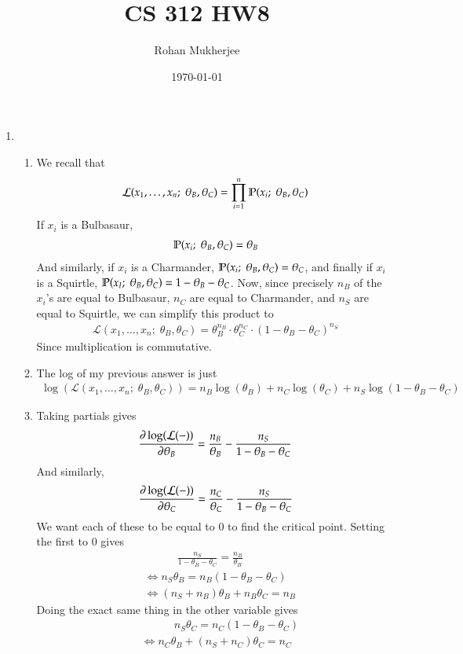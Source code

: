 \documentclass[12pt]{article}
\title{CS 312 HW8}
\date{\today}
\author{Rohan Mukherjee}
\theoremstyle{definitionstyle}
\renewcommand{\P}{\mathbb{P}\qty}
\renewcommand{\L}{\mathcal{L}}
\newcommand{\semi}{; \;}
\begin{document}
	\maketitle
	\begin{enumerate}[leftmargin=\labelsep]
		\item \begin{enumerate}
			\item We recall that 
			\begin{align*}
				\mathcal{L}(x_1, \ldots, x_n \semi \theta_B, \theta_C) = \prod_{i=1}^n \P(x_i \semi \theta_B, \theta_C)
			\end{align*}
			If $x_i$ is a Bulbasaur, 
			\begin{align*}
				\P(x_i \semi \theta_B, \theta_C) = \theta_B
			\end{align*}
			And similarly, if $x_i$ is a Charmander, $\P(x_i \semi \theta_B, \theta_C) = \theta_C$, and finally if $x_i$ is a Squirtle, $\P(x_I \semi \theta_B, \theta_C) = 1 - \theta_B - \theta_C$. Now, since precisely $n_B$ of the $x_i$'s are equal to Bulbasaur, $n_C$ are equal to Charmander, and $n_S$ are equal to Squirtle, we can simplify this product to
			\begin{align*}
				\mathcal{L}(x_1, \ldots, x_n \semi \theta_B, \theta_C) = \theta_B^{n_B} \cdot \theta_C^{n_C} \cdot (1-\theta_B-\theta_C)^{n_S}
			\end{align*}
			Since multiplication is commutative.
			
			\item The log of my previous answer is just
			\begin{align*}
				\log(\mathcal{L}(x_1, \ldots, x_n \semi \theta_B, \theta_C)) = n_B\log(\theta_B) + n_C\log(\theta_C) + n_S\log(1-\theta_B-\theta_C)
			\end{align*}
			\item Taking partials gives
			\begin{align*}
				\pdv{\log(\L(-))}{\theta_B} = \frac{n_B}{\theta_B} - \frac{n_S}{1-\theta_B-\theta_C}
			\end{align*}
			And similarly,
			\begin{align*}
				\pdv{\log(\L(-))}{\theta_C} = \frac{n_C}{\theta_C} - \frac{n_S}{1-\theta_B-\theta_C}
			\end{align*}
			We want each of these to be equal to 0 to find the critical point. Setting the first to 0 gives
			\begin{align*}
				&\quad \quad \quad \frac{n_S}{1-\theta_B-\theta_C} = \frac{n_B}{\theta_B} \\
				&\iff n_S\theta_B = n_B(1-\theta_B-\theta_C) \\
				&\iff (n_S+n_B)\theta_B + n_B\theta_C = n_B
			\end{align*}
			Doing the exact same thing in the other variable gives \begin{align*}
				&\quad \quad \quad n_S\theta_C = n_C(1-\theta_B-\theta_C) \\
				&\iff n_C\theta_B + (n_S+n_C)\theta_C = n_C
			\end{align*}
			

\end{enumerate}
\end{enumerate}
\end{document}
